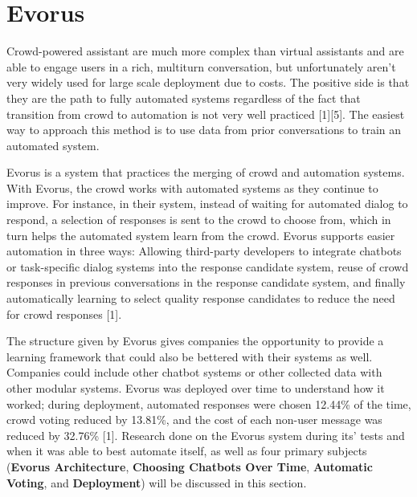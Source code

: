 \documentclass[letterpaper, 10 pt, conference]{IEEEtran}
\begin{document}
\section{Evorus}
Crowd-powered assistant are much more complex than virtual assistants and are able to engage users in a rich, multiturn conversation, but unfortunately aren't very widely used for large scale deployment due to costs. The positive side is that they are the path to fully automated systems regardless of the fact that transition from crowd to automation is not very well practiced [1][5]. The easiest way to approach this method is to use data from prior conversations to train an automated system. \par Evorus is a system that practices the merging of crowd and automation systems. With Evorus, the crowd works with automated systems as they continue to improve. For instance, in their system, instead of waiting for automated dialog to respond, a selection of responses is sent to the crowd to choose from, which in turn helps the automated system learn from the crowd. Evorus supports easier automation in three ways: Allowing third-party developers to integrate chatbots or task-specific dialog systems into the response candidate system, reuse of crowd responses in previous conversations in the response candidate system, and finally automatically learning to select quality response candidates to reduce the need for crowd responses [1]. \par The structure given by Evorus gives companies the opportunity to provide a learning framework that could also be bettered with their systems as well. Companies could include other chatbot systems or other collected data with other modular systems. Evorus was deployed over time to understand how it worked; during deployment, automated responses were chosen 12.44\% of the time, crowd voting reduced by 13.81\%, and the cost of each non-user message was reduced by 32.76\% [1]. Research done on the Evorus system during its' tests and when it was able to best automate itself, as well as four primary subjects (\textbf{Evorus Architecture}, \textbf{Choosing Chatbots Over Time}, \textbf{Automatic Voting}, and \textbf{Deployment}) will be discussed in this section.
\end{document}

